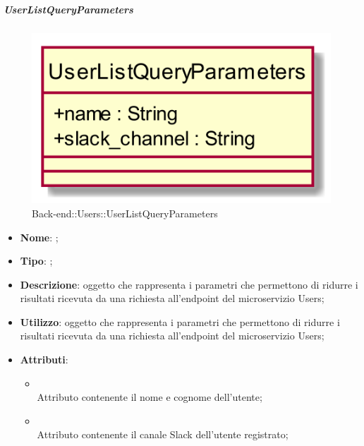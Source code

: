\hypertarget{UserListQueryParameters_label}{\subparagraph{UserListQueryParameters}}
\begin{figure}[h]
	\centering
	\includegraphics[width=\textwidth,height=\textheight,keepaspectratio]{images/ClassUserListQueryParameters.png}
	\caption{Back-end::Users::UserListQueryParameters}
\end{figure}
\begin{itemize}
	\item \textbf{Nome}: ;
	\item \textbf{Tipo}: ;
	\item \textbf{Descrizione}: oggetto che rappresenta i parametri che permettono di ridurre i risultati ricevuta da una richiesta all'endpoint  del microservizio Users;
	\item \textbf{Utilizzo}: oggetto che rappresenta i parametri che permettono di ridurre i risultati ricevuta da una richiesta all'endpoint  del microservizio Users;
	\item \textbf{Attributi}:
	\begin{itemize}
		\item[]  \\
		Attributo contenente il nome e cognome dell'utente;
		\item[]  \\
		Attributo contenente il canale Slack dell'utente registrato;
	\end{itemize}
\end{itemize}
\FloatBarrier

